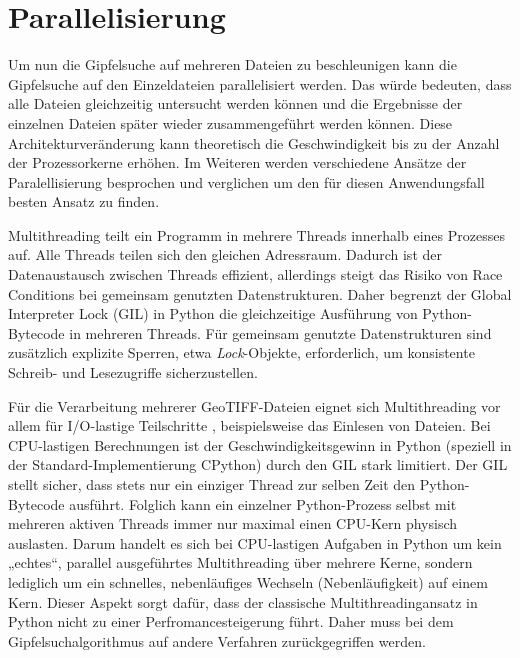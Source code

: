 \section{Parallelisierung} \label{sec:parallelisierung}
Um nun die Gipfelsuche auf mehreren Dateien zu beschleunigen kann die Gipfelsuche auf den Einzeldateien parallelisiert werden.  Das würde bedeuten, dass alle Dateien gleichzeitig untersucht werden können und die Ergebnisse der einzelnen Dateien später wieder zusammengeführt werden können. Diese Architekturveränderung kann theoretisch die Geschwindigkeit bis zu der Anzahl der Prozessorkerne erhöhen. Im Weiteren werden verschiedene Ansätze der Paralellisierung besprochen und verglichen um den für diesen Anwendungsfall besten Ansatz zu finden.

Multithreading teilt ein Programm in mehrere Threads innerhalb eines Prozesses auf. Alle Threads teilen sich den gleichen Adressraum. Dadurch ist der Datenaustausch zwischen Threads effizient, allerdings steigt das Risiko von Race Conditions bei gemeinsam genutzten Datenstrukturen. Daher begrenzt der Global Interpreter Lock (GIL) in Python die gleichzeitige Ausführung von Python-Bytecode in mehreren Threads. Für gemeinsam genutzte Datenstrukturen sind zusätzlich explizite Sperren, etwa \textit{Lock}-Objekte, erforderlich, um konsistente Schreib- und Lesezugriffe sicherzustellen. 

Für die Verarbeitung mehrerer GeoTIFF-Dateien eignet sich Multithreading vor allem für I/O-lastige Teilschritte , beispielsweise das Einlesen von Dateien. Bei CPU-lastigen Berechnungen ist der Geschwindigkeitsgewinn in Python (speziell in der Standard-Implementierung CPython) durch den GIL stark limitiert. Der GIL stellt sicher, dass stets nur ein einziger Thread zur selben Zeit den Python-Bytecode ausführt. Folglich kann ein einzelner Python-Prozess selbst mit mehreren aktiven Threads immer nur maximal einen CPU-Kern physisch auslasten. Darum handelt es sich bei CPU-lastigen Aufgaben in Python um kein „echtes“, parallel ausgeführtes Multithreading über mehrere Kerne, sondern lediglich um ein schnelles, nebenläufiges Wechseln (Nebenläufigkeit) auf einem Kern. Dieser Aspekt sorgt dafür, dass der classische Multithreadingansatz in Python nicht zu einer Perfromancesteigerung führt. Daher muss bei dem Gipfelsuchalgorithmus auf andere Verfahren zurückgegriffen werden.


